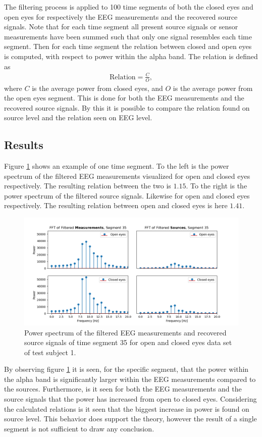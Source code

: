 The filtering process is applied to 100 time segments of both the closed eyes and open eyes for respectively the EEG measurements and the recovered source signals. 
Note that for each time segment all present source signals or sensor measurements have been summed such that only one signal resembles each time segment.
Then for each time segment the relation between closed and open eyes is computed, with respect to power within the alpha band. 
The relation is defined as 
\begin{align*}
\text{Relation} = \frac{C}{O}, 
\end{align*}
where $C$ is the average power from closed eyes, and $O$ is the average power from the open eyes segment. 
This is done for both the EEG measurements and the recovered source signals. 
By this it is possible to compare the relation found on source level and the relation seen on EEG level.  

\subsection{Results}
Figure \ref{fig:dft_2} shows an example of one time segment. 
To the left is the power spectrum of the filtered EEG measurements visualized for open and closed eyes respectively. 
The resulting relation between the two is $1.15$. 
To the right is the power spectrum of the filtered source signals. 
Likewise for open and closed eyes respectively. 
The resulting relation between open and closed eyes is here $1.41$.  
\begin{figure}[H]
\centering
\includegraphics[scale=0.5]{figures/ch_7/FFT_plot.png}
\caption{Power spectrum of the filtered EEG measurements and recovered source signals of time segment 35 for open and closed eyes data set of test subject 1.}
\label{fig:dft_2}
\end{figure}
\noindent
By observing figure \ref{fig:dft_2} it is seen, for the specific segment, that the power within the alpha band is significantly larger within the EEG measurements compared to the sources. 
Furthermore, is it seen for both the EEG measurements and the source signals that the power has increased from open to closed eyes. 
Considering the calculated relations is it seen that the biggest increase in power is found on source level. 
This behavior does support the theory, however the result of a single segment is not sufficient to draw any conclusion.          


